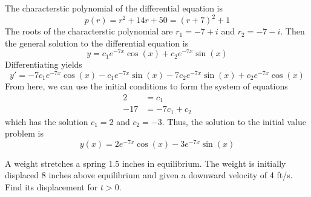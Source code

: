 \documentclass[11pt, titlepage]{article}
\begin{document}
  \begin{solution}
    The characterstic polynomial of the differential equation is
    \begin{equation*}
      p(r) = r^{2} + 14r + 50 = (r + 7)^{2} + 1
    \end{equation*}
    The roots of the characterstic polynomial are \(r_{1} = -7 + i\) and \(r_{2} = -7 - i\).
    Then the general solution to the differential equation is
    \begin{equation*}
      y = c_{1} e^{-7x} \cos(x) + c_{2} e^{-7x} \sin(x)
    \end{equation*}
    Differentiating yields
    \begin{equation*}
      y' = -7c_{1} e^{-7x} \cos(x) - c_{1} e^{-7x} \sin(x) - 7c_{2} e^{-7x} \sin(x) + c_{2} e^{-7x} \cos(x)
    \end{equation*}
    From here, we can use the initial conditions to form the system of equations
    \begin{align*}
      2 &= c_{1} \\
      -17 &= -7c_{1} + c_{2}
    \end{align*}
    which has the solution \(c_{1} = 2\) and \(c_{2} = -3\).
    Thus, the solution to the initial value problem is
    \begin{equation*}
      y(x) = 2 e^{-7x} \cos(x) -3 e^{-7x} \sin(x)
    \end{equation*}
  \end{solution}

  \pagebreak

  \begin{problem}[Trench 6.1.7]
    A weight stretches a spring 1.5 inches in equilibrium.
    The weight is initially displaced 8 inches above equilibrium and given a
    downward velocity of 4 ft/s.
    Find its displacement for \(t > 0\).
  \end{problem}
\end{document}
